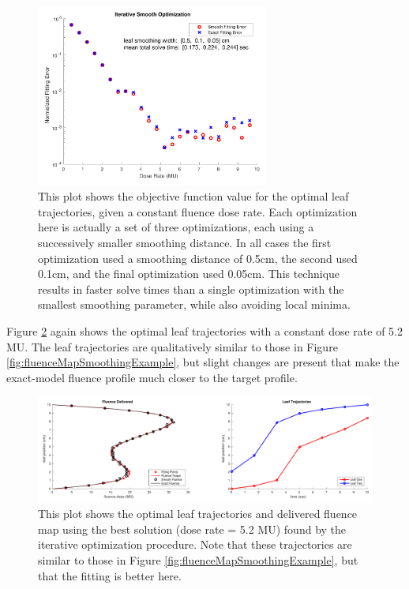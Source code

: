 \documentclass[12pt]{article}
\begin{document}
\begin{figure}
  \centering
  \includegraphics[width=3in]{fig/iterSmoothSweep.pdf}
  \caption{This plot shows the objective function value for the optimal leaf trajectories,
           given a constant fluence dose rate. Each optimization here is actually a set of three
           optimizations, each using a successively smaller smoothing distance. In all cases
           the first optimization used a smoothing distance of 0.5cm, the second used 0.1cm,
           and the final optimization used 0.05cm. This technique results in faster solve times
           than a single optimization with the smallest smoothing parameter, while also avoiding
           local minima.}
  \label{fig:iterSmoothSweep}
\end{figure}

Figure \ref{fig:fluenceMapIterativeBest} again shows the optimal leaf trajectories with a
constant dose rate of 5.2 MU. The leaf trajectories are qualitatively similar to those in
Figure \ref{fig:fluenceMapSmoothingExample}, but slight changes are present that make the
exact-model fluence profile much closer to the target profile.

\begin{figure}
  \centering
  \includegraphics[width=\textwidth]{fig/fluenceMapIterativeBest.pdf}
  \caption{This plot shows the optimal leaf trajectories and delivered fluence map using the
           best solution (dose rate = 5.2 MU) found by the iterative optimization procedure.
           Note that these trajectories are similar to those in
           Figure \ref{fig:fluenceMapSmoothingExample}, but that the fitting is better here.}
  \label{fig:fluenceMapIterativeBest}
\end{figure}
\end{document}
